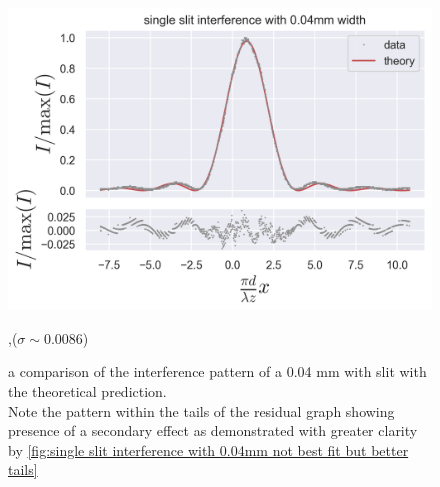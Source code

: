\begin{figure}[H]
    \includegraphics[width=0.9\columnwidth]{figures/single slit interference with 0.04mm width.png}
    \caption{a comparison of the interference pattern of a 0.04 mm with slit with the theoretical prediction.\\
    Note the pattern within the tails of the residual graph showing presence of a secondary effect as demonstrated with
    greater clarity by \ref{fig:single slit interference with 0.04mm not best fit but better tails}}
    \label{fig:single slit interference with 0.04mm width},($\sigma\sim0.0086$)
\end{figure}